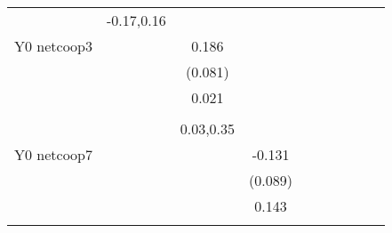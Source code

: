 \begin{table}[!h]
\begin{adjustbox}{width=\columnwidth,center}
\begin{tabular}{l*{8}{c}}
                    &  -0.17,0.16         &                     &                     &                     &                     &                     &                     &                     &                     &                     \\
Y0 netcoop3         &                     &       0.186\sym{**} &                     &                     &                     &                     &                     &                     &                     &                     \\
                    &                     &     (0.081)         &                     &                     &                     &                     &                     &                     &                     &                     \\
                    &                     &       0.021         &                     &                     &                     &                     &                     &                     &                     &                     \\
                    &                     &                     &                     &                     &                     &                     &                     &                     &                     &                     \\
                    &                     &   0.03,0.35         &                     &                     &                     &                     &                     &                     &                     &                     \\
Y0 netcoop7         &                     &                     &      -0.131         &                     &                     &                     &                     &                     &                     &                     \\
                    &                     &                     &     (0.089)         &                     &                     &                     &                     &                     &                     &                     \\
                    &                     &                     &       0.143         &                     &                     &                     &                     &                     &                     &                     \\
                    &                     &                     &                     &                     &                     &                     &                     &                     &                     &                     \\

\end{tabular}
\end{adjustbox}
\end{table}
